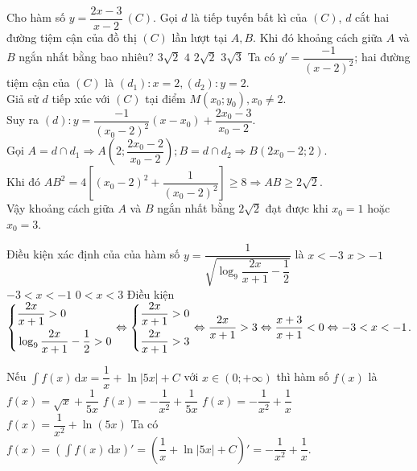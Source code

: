 \begin{ex}%
	Cho hàm số $y=\dfrac{2x-3}{x-2}~(C)$. Gọi $d$ là tiếp tuyến bất kì của $(C)$, $d$ cắt hai đường tiệm cận của đồ thị $(C)$ lần lượt tại $A,B$. Khi đó khoảng cách giữa $A$ và $B$ ngắn nhất bằng bao nhiêu?
	\choice
		{$3\sqrt{2}$}
		{$4$}
		{\True $2\sqrt{2}$}
		{$3\sqrt{3}$}
	\loigiai
		{
			Ta có $y'=\dfrac{-1}{{\left(x-2\right)}^2}$; hai đường tiệm cận của $(C)$ là $(d_1) : x=2,(d_2) : y=2$. \\
			Giả sử $d$ tiếp xúc với $(C)$ tại điểm $M\left(x_0;y_0\right),x_0\ne 2$. \\
			Suy ra $(d):y=\dfrac{-1}{{\left(x_0-2\right)}^2}\left(x-x_0\right)+\dfrac{2x_0-3}{x_0-2}$. \\
			Gọi $A=d \cap d_1\Rightarrow A\left(2;\dfrac{2x_0-2}{x_0-2}\right);B=d\cap d_2\Rightarrow B\left(2x_0-2;2\right)$. \\
			Khi đó $AB^2=4\left[{\left(x_0-2\right)}^2+\dfrac{1}{{\left(x_0-2\right)}^2}\right]\ge 8\Rightarrow AB\ge 2\sqrt{2}$. \\
			Vậy khoảng cách giữa $A$ và $B$ ngắn nhất bằng $2\sqrt{2}$ đạt được khi $x_0=1$ hoặc $x_0=3$.	
		}
\end{ex}

\begin{ex}%
	Điều kiện xác định của của hàm số $y=\dfrac{1}{\sqrt{\log_9\dfrac{2x}{x+1}-\dfrac{1}{2}}}$ là
	\choice
		{$x<-3$}
		{$x>-1$}
		{\True $-3<x<-1$}
		{$0<x<3$}
	\loigiai
		{
			Điều kiện $\left\{\begin{aligned}
				& \dfrac{2x}{x+1}>0 \\ 
				& \log_9\dfrac{2x}{x+1}-\dfrac{1}{2}>0\end{aligned}\right.\Leftrightarrow \left\{\begin{aligned}
				& \dfrac{2x}{x+1}>0 \\ 
				& \dfrac{2x}{x+1}>3\end{aligned}\right.\Leftrightarrow \dfrac{2x}{x+1}>3\Leftrightarrow \dfrac{x+3}{x+1}<0\Leftrightarrow-3<x<-1$.
		}
\end{ex}

\begin{ex}%
	Nếu $\displaystyle \int f(x) \mathrm{\,d}x = \dfrac{1}{x} + \ln |5x| + C$ với $x \in (0;+\infty)$ thì hàm số $f(x)$ là
	\choice
		{$f(x) = \sqrt{x} + \dfrac{1}{5x}$}
		{$f(x) = -\dfrac{1}{x^2} + \dfrac{1}{5x}$}
		{\True $f(x) = -\dfrac{1}{x^2} + \dfrac{1}{x}$}
		{$f(x) = \dfrac{1}{x^2} + \ln (5x)$}
	\loigiai
		{
			Ta có $f(x) = \left(\displaystyle \int f(x) \mathrm{\,d}x\right)' = \left(\dfrac{1}{x} + \ln |5x| + C\right)' = -\dfrac{1}{x^2} + \dfrac{1}{x}$.
		}
\end{ex}

